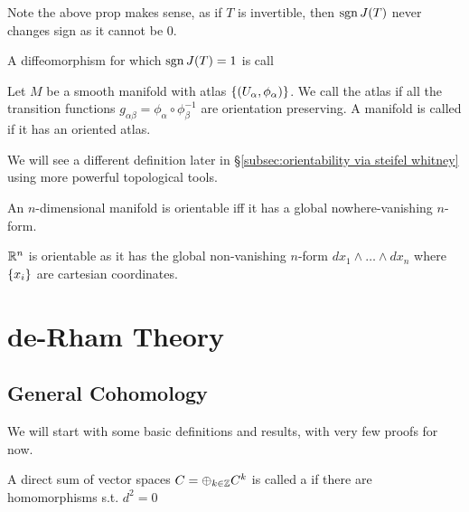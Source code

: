 \documentclass{article}
\begin{document}
\begin{remark}
	Note the above prop makes sense, as if $T$ is invertible, then $\operatorname{sgn} J(T)$ never changes sign as it cannot be 0. 
\end{remark}

\begin{definition}
	A diffeomorphism for which $\operatorname{sgn} J(T)=1$ is call 
\end{definition}

\begin{definition}
	Let $M$ be a smooth manifold with atlas $\left\{ (U_\alpha,\phi_\alpha) \right\}$. We call the atlas  if all the transition functions $g_{\alpha\beta}=\phi_\alpha \circ \phi_\beta^{-1}$ are orientation preserving. A manifold is called  if it has an oriented atlas. 
\end{definition}

\begin{remark}
 We will see a different definition later in \S\ref{subsec:orientability via steifel whitney} using more powerful topological tools. 
\end{remark}

\begin{prop}
	An $n$-dimensional manifold is orientable iff it has a global nowhere-vanishing $n$-form. 
\end{prop}

\begin{example}
	$\mathbb{R}^n$ is orientable as it has the global non-vanishing $n$-form $dx_1 \wedge \dots \wedge dx_n$ where $\left\{ x_i \right\}$ are cartesian coordinates.  
\end{example}


\section{de-Rham Theory}
\subsection{General Cohomology}
We will start with some basic definitions and results, with very few proofs for now. 

\begin{definition}
	A direct sum of vector spaces $C = \oplus_{k \in \mathbb{Z}} C^k$ is called a  if there are homomorphisms
	s.t. $d^2=0$
\end{definition}
\end{document}

